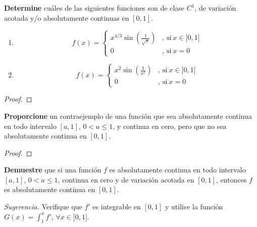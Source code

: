 \documentclass[12pt]{report}
\theoremstyle{largebreak}
\begin{document}
    \begin{excer}
        \textbf{Determine} cuáles de las siguientes funciones son de clase $C^1$, de variación acotada y/o absolutamente continuas en $[0,1]$.
        \begin{enumerate}
            \item \begin{equation*}
                f(x) = 
                \left \{
                    \begin{aligned}
                    x^{4/3}\sin\left(\frac{1}{\sqrt{x}}\right) &,\ \text{si} \ x \in ]0,1]\\
                    0 &,\ \text{si} \ x=0
                    \end{aligned}
                \right .
            \end{equation*}
            \item \begin{equation*}
                f(x) = 
                \left \{
                    \begin{aligned}
                    x^2\sin\left(\frac{1}{x^2}\right) &,\ \text{si} \ x \in ]0,1]\\
                    0 &,\ \text{si} \ x=0
                    \end{aligned}
                \right .
            \end{equation*}
        \end{enumerate}
    \end{excer}

    \begin{proof}
        
    \end{proof}

    \begin{excer}
        \textbf{Proporcione} un contraejemplo de una función que sea absolutamente continua en todo intervalo $[a,1]$, $0< a\leq 1$, y continua en cero, pero que no sea absolutamente continua en $[0,1]$.
    \end{excer}

    \begin{proof}
        
    \end{proof}

    \begin{excer}
        \textbf{Demuestre} que si una función $f$ es absolutamente continua en todo intervalo $[a,1]$, $0< a\leq 1$, continua en cero y de variación acotada en $[0,1]$, entonces $f$ es absolutamente continua en $[0,1]$.
        
        \textit{Sugerencia.} Verifique que $f'$ es integrable en $[0,1]$ y utilice la función $G(x)=\int_{1}^{x}f'$, $\forall x\in]0,1]$.
    \end{excer}
\end{document}
